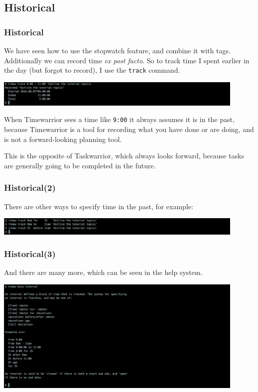 \documentclass[t,handout]{beamer}
\begin{document}
\subsection{Historical}

\begin{frame}[fragile]\frametitle{Historical}
    We have seen how to use the stopwatch feature, and combine it with tags. Additionally we can record time \textit{ex post facto}. So to track time I spent earlier in the day (but forgot to record), I use the \verb=track= command.

    \includegraphics[width=12cm]{images/tutorial15.png}

    When Timewarrior sees a time like \verb=9:00= it always assumes it is in the past, because Timewarrior is a tool for recording what you have done or are doing, and is not a forward-looking planning tool.

    This is the opposite of Taskwarrior, which always looks forward, because tasks are generally going to be completed in the future.
\end{frame}

\begin{frame}[fragile]\frametitle{Historical(2)}
    There are other ways to specify time in the past, for example:

    \includegraphics[width=12cm]{images/tutorial16.png}
\end{frame}

\begin{frame}[fragile]\frametitle{Historical(3)}
    And there are many more, which can be seen in the help system.

    \includegraphics[width=12cm]{images/tutorial17.png}
\end{frame}
\end{document}
